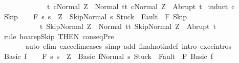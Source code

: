 \begin{isabellebody}
\ \ \ \ \ \ \ \ \ \ \ \ \ {\isacharbraceleft}t{\isachardot}\ {\isasymGamma}{\isasymturnstile}{\isasymlangle}c{\isacharcomma}Normal\ Z{\isasymrangle}\ {\isasymRightarrow}\ Normal\ t{\isacharbraceright}{\isacharcomma}{\isacharbraceleft}t{\isachardot}\ {\isasymGamma}{\isasymturnstile}{\isasymlangle}c{\isacharcomma}Normal\ Z{\isasymrangle}\ {\isasymRightarrow}\ Abrupt\ t{\isacharbraceright}{\isachardoublequoteclose}\isanewline
%
\isadelimproof
%
\endisadelimproof
%
\isatagproof
{}\isamarkupfalse%
\ {\isacharparenleft}induct\ c{\isacharparenright}\isanewline
\ \ \isamarkupfalse%
\ Skip\isanewline
\ \ \isamarkupfalse%
\ {\isachardoublequoteopen}{\isasymGamma}{\isacharcomma}{\isasymTheta}{\isasymturnstile}\isactrlbsub {\isacharslash}F\isactrlesub \ {\isacharbraceleft}s{\isachardot}\ s\ {\isacharequal}\ Z\ {\isasymand}\ {\isasymGamma}{\isasymturnstile}{\isasymlangle}Skip{\isacharcomma}Normal\ s{\isasymrangle}\ {\isasymRightarrow}{\isasymnotin}{\isacharparenleft}{\isacharbraceleft}Stuck{\isacharbraceright}\ {\isasymunion}\ Fault\ {\isacharbackquote}\ {\isacharparenleft}{\isacharminus}F{\isacharparenright}{\isacharparenright}{\isacharbraceright}\ Skip\isanewline
\ \ \ \ \ \ \ \ \ \ \ {\isacharbraceleft}t{\isachardot}\ {\isasymGamma}{\isasymturnstile}{\isasymlangle}Skip{\isacharcomma}Normal\ Z{\isasymrangle}\ {\isasymRightarrow}\ Normal\ t{\isacharbraceright}{\isacharcomma}{\isacharbraceleft}t{\isachardot}\ {\isasymGamma}{\isasymturnstile}{\isasymlangle}Skip{\isacharcomma}Normal\ Z{\isasymrangle}\ {\isasymRightarrow}\ Abrupt\ t{\isacharbraceright}{\isachardoublequoteclose}\isanewline
\ \ \ \ \isamarkupfalse%
\ {\isacharparenleft}rule\ hoarep{\isachardot}Skip\ {\isacharbrackleft}THEN\ conseqPre{\isacharbrackright}{\isacharparenright}\isanewline
\ \ \ \ \ \ \ {\isacharparenleft}auto\ elim{\isacharcolon}\ exec{\isacharunderscore}elim{\isacharunderscore}cases\ simp\ add{\isacharcolon}\ final{\isacharunderscore}notin{\isacharunderscore}def\ intro{\isacharcolon}\ exec{\isachardot}intros{\isacharparenright}\isanewline
{}\isamarkupfalse%
\isanewline
\ \ \isamarkupfalse%
\ {\isacharparenleft}Basic\ f{\isacharparenright}\isanewline
\ \ \isamarkupfalse%
\ {\isachardoublequoteopen}{\isasymGamma}{\isacharcomma}{\isasymTheta}{\isasymturnstile}\isactrlbsub {\isacharslash}F\isactrlesub \ {\isacharbraceleft}s{\isachardot}\ s\ {\isacharequal}\ Z\ {\isasymand}\ {\isasymGamma}{\isasymturnstile}{\isasymlangle}Basic\ f{\isacharcomma}Normal\ s{\isasymrangle}\ {\isasymRightarrow}{\isasymnotin}{\isacharparenleft}{\isacharbraceleft}Stuck{\isacharbraceright}\ {\isasymunion}\ Fault\ {\isacharbackquote}\ {\isacharparenleft}{\isacharminus}F{\isacharparenright}{\isacharparenright}{\isacharbraceright}\ Basic\ f\isanewline

\end{isabellebody}
